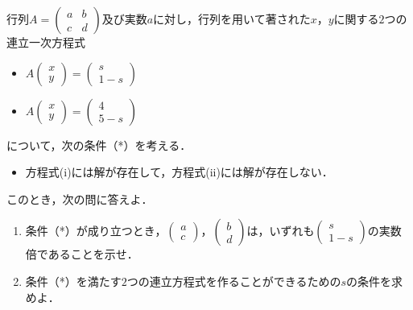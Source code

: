 行列$A=\begin{pmatrix}a&b\\ c&d\end{pmatrix}$及び実数$a$に対し，行列を用いて著された$x$，$y$に関する$2$つの連立一次方程式
\begin{itemize}
  \item[(i)] $A\begin{pmatrix} x\\ y\end{pmatrix}=\begin{pmatrix} s\\ 1-s\end{pmatrix}$
  \item[(ii)] $A\begin{pmatrix} x\\ y\end{pmatrix}=\begin{pmatrix} 4\\ 5-s\end{pmatrix}$
\end{itemize}
について，次の条件（*）を考える．
\begin{itemize}
  \item[（*）] 方程式(i)には解が存在して，方程式(ii)には解が存在しない．
\end{itemize}
このとき，次の問に答えよ．
\begin{enumerate}
  \item 条件（*）が成り立つとき，$\begin{pmatrix} a\\ c\end{pmatrix}$，$\begin{pmatrix} b\\ d\end{pmatrix}$は，いずれも$\begin{pmatrix} s\\ 1-s\end{pmatrix}$の実数倍であることを示せ．
  \item 条件（*）を満たす$2$つの連立方程式を作ることができるための$s$の条件を求めよ．
\end{enumerate}
